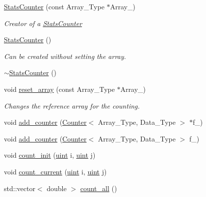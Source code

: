 \begin{DoxyCompactItemize}
\item 
\hyperlink{classbarry_1_1_stats_counter_a43e9fa90ef0b1fb716f0e75d1b803ef1}{Stats\+Counter} (const Array\+\_\+\+Type $\ast$Array\+\_\+)
\begin{DoxyCompactList}\small\item\em Creator of a {\ttfamily \hyperlink{classbarry_1_1_stats_counter}{Stats\+Counter}} \end{DoxyCompactList}\item 
\hyperlink{classbarry_1_1_stats_counter_a407df1580b207faac92c476c7062b840}{Stats\+Counter} ()
\begin{DoxyCompactList}\small\item\em Can be created without setting the array. \end{DoxyCompactList}\item 
\hyperlink{classbarry_1_1_stats_counter_a2824d86765d94e909e4b33396250b6c7}{$\sim$\+Stats\+Counter} ()
\item 
void \hyperlink{classbarry_1_1_stats_counter_a8dabc3a7a9931acbb76900a67d728f70}{reset\+\_\+array} (const Array\+\_\+\+Type $\ast$Array\+\_\+)
\begin{DoxyCompactList}\small\item\em Changes the reference array for the counting. \end{DoxyCompactList}\item 
void \hyperlink{classbarry_1_1_stats_counter_a829e41243a7b18cf71337deeec9f7030}{add\+\_\+counter} (\hyperlink{classbarry_1_1_counter}{Counter}$<$ Array\+\_\+\+Type, Data\+\_\+\+Type $>$ $\ast$f\+\_\+)
\item 
void \hyperlink{classbarry_1_1_stats_counter_ad175dcd2bd30d017881783de546ac333}{add\+\_\+counter} (\hyperlink{classbarry_1_1_counter}{Counter}$<$ Array\+\_\+\+Type, Data\+\_\+\+Type $>$ f\+\_\+)
\item 
void \hyperlink{classbarry_1_1_stats_counter_a19bd5936619e190c0d8918b4f343922e}{count\+\_\+init} (\hyperlink{namespacebarry_a11dfc53ddb4672278319aa04f1e09a6c}{uint} i, \hyperlink{namespacebarry_a11dfc53ddb4672278319aa04f1e09a6c}{uint} j)
\item 
void \hyperlink{classbarry_1_1_stats_counter_ab81166f7cb67eeaecc469016d237019a}{count\+\_\+current} (\hyperlink{namespacebarry_a11dfc53ddb4672278319aa04f1e09a6c}{uint} i, \hyperlink{namespacebarry_a11dfc53ddb4672278319aa04f1e09a6c}{uint} j)
\item 
std\+::vector$<$ double $>$ \hyperlink{classbarry_1_1_stats_counter_a83bd92031a1499109c98f238221cbd67}{count\+\_\+all} ()
\end{DoxyCompactItemize}
